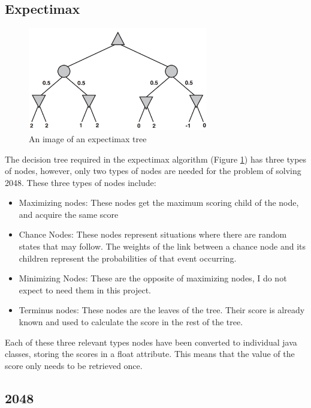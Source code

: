 \documentclass{article}
\begin{document}
\subsection{Expectimax}
\label{subsec:expectimax}
\begin{figure}
    \centering
    \includegraphics[width=0.7\textwidth]{expectimax.png}
    \caption{An image of an expectimax tree \cite[p.~200]{russell2010artificial}}
    \label{fig:expectree}
\end{figure}
The decision tree required in the expectimax algorithm (Figure \ref{fig:expectree}) has three types of nodes, however, only two types of nodes are needed for the problem of solving 2048. These three types of nodes include:
\begin{itemize}
    \item Maximizing nodes: These nodes get the maximum scoring child of the node, and acquire the same score
    \item Chance Nodes: These nodes represent situations where there are random states that may follow. The weights of the link between a chance node and its children represent the probabilities of that event occurring.
    \item Minimizing Nodes: These are the opposite of maximizing nodes, I do not expect to need them in this project.
    \item Terminus nodes: These nodes are the leaves of the tree. Their score is already known and used to calculate the score in the rest of the tree.
\end{itemize}
Each of these three relevant types nodes have been converted to individual java classes, storing the scores in a float attribute. This means that the value of the score only needs to be retrieved once.

\subsection{2048}
\label{subsec:2048}
\end{document}
